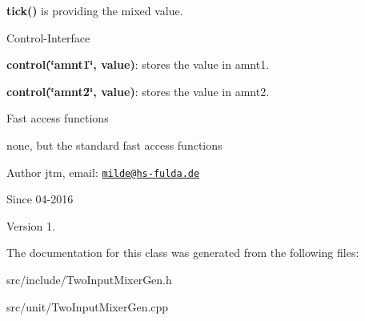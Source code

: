 \begin{DoxyItemize}
\item {\bfseries tick()} is providing the mixed value.
\end{DoxyItemize}

Control-\/\-Interface


\begin{DoxyItemize}
\item {\bfseries control(\char`\"{}amnt1\char`\"{}, value)}\-: stores the value in amnt1.
\item {\bfseries control(\char`\"{}amnt2\char`\"{}, value)}\-: stores the value in amnt2.
\end{DoxyItemize}

Fast access functions
\begin{DoxyItemize}
\item none, but the standard fast access functions
\end{DoxyItemize}

\begin{DoxyAuthor}{Author}
jtm, email\-:  \href{mailto:milde@hs-fulda.de}{\tt milde@hs-\/fulda.\-de} 
\end{DoxyAuthor}
\begin{DoxySince}{Since}
04-\/2016 
\end{DoxySince}
\begin{DoxyVersion}{Version}
1. 
\end{DoxyVersion}


The documentation for this class was generated from the following files\-:\begin{DoxyCompactItemize}
\item 
src/include/Two\-Input\-Mixer\-Gen.\-h\item 
src/unit/Two\-Input\-Mixer\-Gen.\-cpp\end{DoxyCompactItemize}
